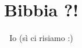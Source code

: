 \documentclass[a4paper,twocolumn]{article}
\theoremstyle{definition}
\theoremstyle{remark}
\theoremstyle{plain}
\begin{document}
\author{Io (sì ci risiamo :)}
\title{\textbf{Bibbia ?!}}
\maketitle
\end{document}
